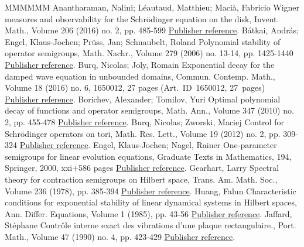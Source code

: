 \documentclass[11pt]{article}
\theoremstyle{definition}
\numberwithin{equation}{section}
\numberwithin{figure}{section}
\numberwithin{table}{section}
\newcommand{\1}{\mathds 1}
\begin{document}
\begin{thebibliography}{MMMMMM}
 Anantharaman, Nalini; Léautaud, Matthieu; Macià, Fabricio Wigner measures and observability for the Schrödinger equation on the disk, Invent. Math., Volume 206 (2016) no. 2, pp. 485-599 \href{https://ahl.centre-mersenne.org/item/AHL_2018__1__297_0/#AnantharamanLeMa16}{Publisher reference}.
 Bátkai, András; Engel, Klaus-Jochen; Prüss, Jan; Schnaubelt, Roland Polynomial stability of operator semigroups, Math. Nachr., Volume 279 (2006) no. 13-14, pp. 1425-1440 \href{https://ahl.centre-mersenne.org/item/AHL_2018__1__297_0/#BatkaiEngPruSch06}{Publisher reference}.
 Burq, Nicolas; Joly, Romain Exponential decay for the damped wave equation in unbounded domains, Commun. Contemp. Math., Volume 18 (2016) no. 6, 1650012, 27 pages (Art. ID 1650012, 27 pages) \href{https://ahl.centre-mersenne.org/item/AHL_2018__1__297_0/#BurqJo}{Publisher reference}.
 Borichev, Alexander; Tomilov, Yuri Optimal polynomial decay of functions and operator semigroups, Math. Ann., Volume 347 (2010) no. 2, pp. 455-478 \href{https://ahl.centre-mersenne.org/item/AHL_2018__1__297_0/#BorichevTo10}{Publisher reference}.
 Burq, Nicolas; Zworski, Maciej Control for Schrödinger operators on tori, Math. Res. Lett., Volume 19 (2012) no. 2, pp. 309-324 \href{https://ahl.centre-mersenne.org/item/AHL_2018__1__297_0/#BurqZwo12}{Publisher reference}.
 Engel, Klaus-Jochen; Nagel, Rainer One-parameter semigroups for linear evolution equations, Graduate Texts in Mathematics, 194, Springer, 2000, xxi+586 pages \href{https://ahl.centre-mersenne.org/item/AHL_2018__1__297_0/#engel}{Publisher reference}.
 Gearhart, Larry Spectral theory for contraction semigroups on Hilbert space, Trans. Am. Math. Soc., Volume 236 (1978), pp. 385-394 \href{https://ahl.centre-mersenne.org/item/AHL_2018__1__297_0/#Gearhart78}{Publisher reference}.
 Huang, Falun Characteristic conditions for exponential stability of linear dynamical systems in Hilbert spaces, Ann. Differ. Equations, Volume 1 (1985), pp. 43-56 \href{https://ahl.centre-mersenne.org/item/AHL_2018__1__297_0/#Huang85}{Publisher reference}.
 Jaffard, Stéphane Contrôle interne exact des vibrations d’une plaque rectangulaire., Port. Math., Volume 47 (1990) no. 4, pp. 423-429 \href{https://ahl.centre-mersenne.org/item/AHL_2018__1__297_0/#Jaffard90}{Publisher reference}.

\end{thebibliography}
\end{document}
